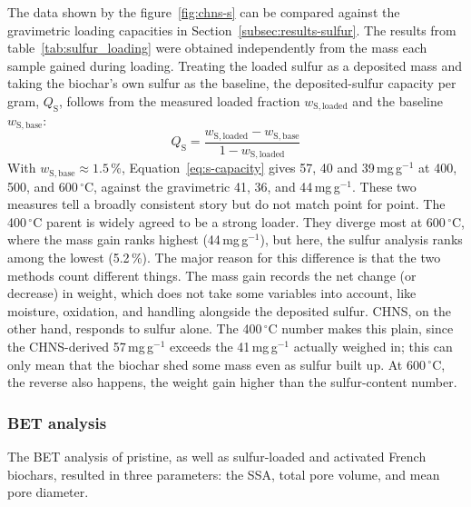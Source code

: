 The data shown by the figure~\ref{fig:chns-s} can be compared against the gravimetric loading capacities in Section~\ref{subsec:results-sulfur}. The results from table~\ref{tab:sulfur_loading} were obtained independently from the mass each sample gained during loading. Treating the loaded sulfur as a deposited mass and taking the biochar's own sulfur as the baseline, the deposited-sulfur capacity per gram, $Q_\mathrm{S}$, follows from the measured loaded fraction $w_\mathrm{S,loaded}$ and the baseline $w_\mathrm{S,base}$:
\begin{equation}
Q_\mathrm{S} = \frac{w_\mathrm{S,loaded} - w_\mathrm{S,base}}{1 - w_\mathrm{S,loaded}}
\label{eq:s-capacity}
\end{equation}
With $w_\mathrm{S,base}\approx1.5\,\%$, Equation~\ref{eq:s-capacity} gives 57, 40 and 39\,mg\,g$^{-1}$ at 400, 500, and 600\,$^{\circ}$C, against the gravimetric 41, 36, and 44\,mg\,g$^{-1}$. These two measures tell a broadly consistent story but do not match point for point. The 400\,$^{\circ}$C parent is widely agreed to be a strong loader. They diverge most at 600\,$^{\circ}$C, where the mass gain ranks highest (44\,mg\,g$^{-1}$), but here, the sulfur analysis ranks among the lowest (5.2\,\%). The major reason for this difference is that the two methods count different things. The mass gain records the net change (or decrease) in weight, which does not take some variables into account, like moisture, oxidation, and handling alongside the deposited sulfur. CHNS, on the other hand, responds to sulfur alone. The 400\,$^{\circ}$C number makes this plain, since the CHNS-derived 57\,mg\,g$^{-1}$ exceeds the 41\,mg\,g$^{-1}$ actually weighed in; this can only mean that the biochar shed some mass even as sulfur built up. At 600\,$^{\circ}$C, the reverse also happens, the weight gain higher than the sulfur-content number.



\newpage
\subsubsection{BET analysis}
\label{subsubsec:bet}
The BET analysis of pristine, as well as sulfur-loaded and activated French biochars, resulted in three parameters: the SSA, total pore volume, and mean pore diameter.  

